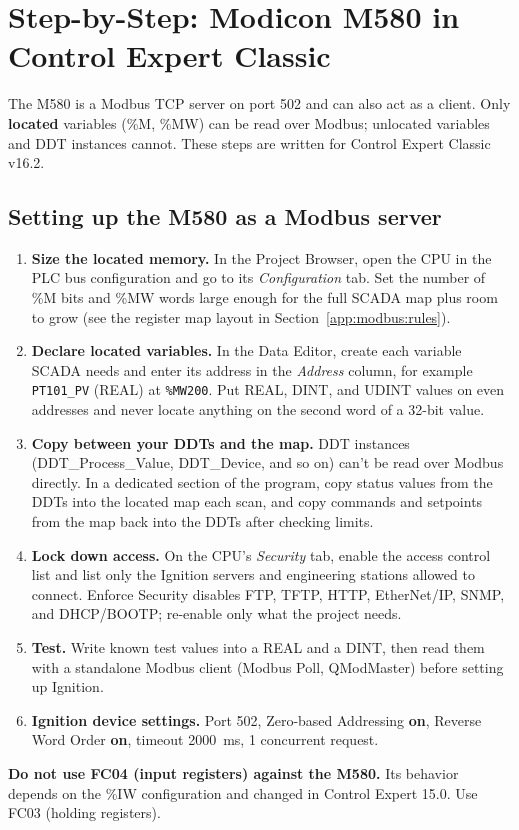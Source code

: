 \section{Step-by-Step: Modicon M580 in Control Expert Classic}
\label{app:modbus:m580}
The M580 is a Modbus TCP server on port 502 and can also act as a client. Only \textbf{located} variables (\%M, \%MW) can be read over Modbus; unlocated variables and DDT instances cannot. These steps are written for Control Expert Classic v16.2.

\subsection*{Setting up the M580 as a Modbus server}
\begin{enumerate}[itemsep=2pt]
  \item \textbf{Size the located memory.} In the Project Browser, open the CPU in the PLC bus configuration and go to its \emph{Configuration} tab. Set the number of \%M bits and \%MW words large enough for the full SCADA map plus room to grow (see the register map layout in Section~\ref{app:modbus:rules}).
  \item \textbf{Declare located variables.} In the Data Editor, create each variable SCADA needs and enter its address in the \emph{Address} column, for example \texttt{PT101\_PV} (REAL) at \texttt{\%MW200}. Put REAL, DINT, and UDINT values on even addresses and never locate anything on the second word of a 32-bit value.
  \item \textbf{Copy between your DDTs and the map.} DDT instances (DDT\_Process\_Value, DDT\_Device, and so on) can't be read over Modbus directly. In a dedicated section of the program, copy status values from the DDTs into the located map each scan, and copy commands and setpoints from the map back into the DDTs after checking limits.
  \item \textbf{Lock down access.} On the CPU's \emph{Security} tab, enable the access control list and list only the Ignition servers and engineering stations allowed to connect. Enforce Security disables FTP, TFTP, HTTP, EtherNet/IP, SNMP, and DHCP/BOOTP; re-enable only what the project needs.
  \item \textbf{Test.} Write known test values into a REAL and a DINT, then read them with a standalone Modbus client (Modbus Poll, QModMaster) before setting up Ignition.
  \item \textbf{Ignition device settings.} Port 502, Zero-based Addressing \textbf{on}, Reverse Word Order \textbf{on}, timeout 2000~ms, 1 concurrent request.
\end{enumerate}
\textbf{Do not use FC04 (input registers) against the M580.} Its behavior depends on the \%IW configuration and changed in Control Expert 15.0. Use FC03 (holding registers).

